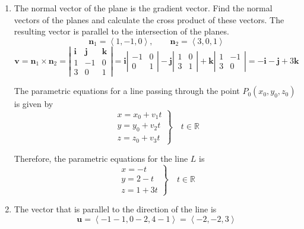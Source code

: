 \documentclass[a4paper, 12pt]{article}
\renewcommand{\headrulewidth}{0pt}
\begin{document}
\newpage
\pagestyle{fancy}
\renewcommand{\headrulewidth}{1pt}


\begin{enumerate}[leftmargin=*,label=\textbf{\arabic*.}]
\item The normal vector of the plane is the gradient vector. Find the normal vectors of the planes and calculate the cross product of these vectors. The resulting vector is parallel to the intersection of the planes.
\[\mathbf{n}_1=\left\langle1,-1,0\right\rangle,\qquad \mathbf{n}_2=\left\langle3,0,1\right\rangle\]
\[\mathbf{v}=\mathbf{n}_1\times\mathbf{n}_2=\left|\begin{array}{ccc}
\mathbf{i}&\mathbf{j}&\mathbf{k}\\
1&-1&0\\
3&0&1
\end{array}\right|=\mathbf{i}\left|\begin{array}{cc}
-1&0\\0&1
\end{array}\right|-\mathbf{j}\left|\begin{array}{cc}
1&0\\3&1
\end{array}\right|+\mathbf{k}\left|\begin{array}{cc}
1&-1\\3&0
\end{array}\right|=-\mathbf{i}-\mathbf{j}+3\mathbf{k}\]

The parametric equations for a line passing through the point $P_0(x_0,y_0,z_0)$ is given by
\[\left.\begin{array}{c}
x=x_0+v_1t\\
y=y_0+v_2t\\
z=z_0+v_3t
\end{array}\right\}\quad t\in\mathbb{R}\]

Therefore, the parametric equations for the line $L$ is
\[\boxed{\left.\begin{array}{l}
x=-t\\
y=2-t\\
z=1+3t
\end{array}\right\}\quad t\in\mathbb{R}}\]

\item The vector that is parallel to the direction of the line is
\[\mathbf u=\left\langle-1-1,0-2,4-1\right\rangle=\left\langle-2,-2,3\right\rangle\]


\end{enumerate}
\end{document}
